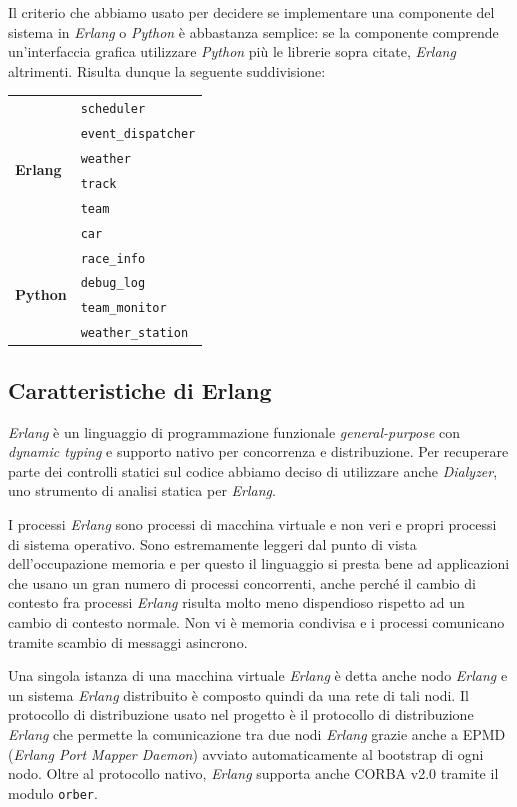 \documentclass[11pt,a4paper]{report}
\newcommand{\Erlang}{\textsl{Erlang}}
\newcommand{\Python}{\textsl{Python}}
\begin{document}
Il criterio che abbiamo usato per decidere se implementare una componente del sistema in \Erlang{} o \Python{} è abbastanza semplice: se la componente comprende un'interfaccia grafica utilizzare \Python{} più le librerie sopra citate, \Erlang{} altrimenti. Risulta dunque la seguente suddivisione:
\begin{center}
\begin{tabular}{|p{}|p{}|}
\hline
\multirow{6}{*}{\textbf{Erlang}} & \texttt{scheduler}\\
& \texttt{event\_dispatcher}\\
& \texttt{weather}\\
& \texttt{track}\\
& \texttt{team}\\
& \texttt{car} \\
\hline
\multirow{4}{*}{\textbf{Python}} & \texttt{race\_info}\\
& \texttt{debug\_log}\\
& \texttt{team\_monitor}\\
& \texttt{weather\_station}\\
\hline
\end{tabular}
\end{center}

\subsection*{Caratteristiche di Erlang}
\Erlang{} è un linguaggio di programmazione funzionale \textit{general-purpose} con \textit{dynamic typing} e supporto nativo per concorrenza e distribuzione. Per recuperare parte dei controlli statici sul codice abbiamo deciso di utilizzare anche \textsl{Dialyzer}, uno strumento di analisi statica per \Erlang{}.

I processi \Erlang{} sono processi di macchina virtuale e non veri e propri processi di sistema operativo. Sono estremamente leggeri dal punto di vista dell'occupazione memoria e per questo il linguaggio si presta bene ad applicazioni che usano un gran numero di processi concorrenti, anche perché il cambio di contesto fra processi \Erlang{} risulta molto meno dispendioso rispetto ad un cambio di contesto normale.
Non vi è memoria condivisa e i processi comunicano tramite scambio di messaggi asincrono.



Una singola istanza di una macchina virtuale \Erlang{} è detta anche nodo \Erlang{} e un sistema \Erlang{} distribuito è composto quindi da una rete di tali nodi. Il protocollo di distribuzione usato nel progetto è il protocollo di distribuzione \Erlang{} che permette la comunicazione tra due nodi \Erlang{} grazie anche a EPMD (\textsl{Erlang Port Mapper Daemon}) avviato automaticamente al bootstrap di ogni nodo. Oltre al protocollo nativo, \Erlang{} supporta anche CORBA v2.0 tramite il modulo \texttt{orber}.
\end{document}
